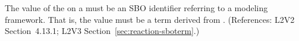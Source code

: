 The value of the   on a \Reaction must be an SBO
identifier referring to a modeling framework.  That is, the value must
be a term derived from \sboevent.  (References: L2V2 Section~4.13.1; L2V3
Section~\ref{sec:reaction-sboterm}.)

